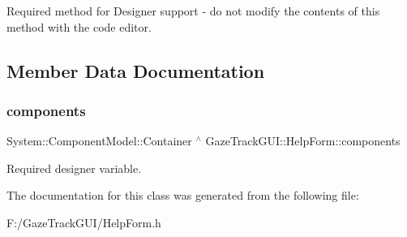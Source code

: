 Required method for Designer support -\/ do not modify the contents of this method with the code editor. 



\subsection{Member Data Documentation}
\mbox{\label{class_gaze_track_g_u_i_1_1_help_form_a562fda94d052719c80f2292dfd896f14}} 
\subsubsection{\texorpdfstring{components}{components}}
{\footnotesize\ttfamily System\+::\+Component\+Model\+::\+Container $^\wedge$ Gaze\+Track\+G\+U\+I\+::\+Help\+Form\+::components\hspace{0.3cm}{\ttfamily [private]}}



Required designer variable. 



The documentation for this class was generated from the following file\+:\begin{DoxyCompactItemize}
\item 
F\+:/\+Gaze\+Track\+G\+U\+I/Help\+Form.\+h\end{DoxyCompactItemize}
